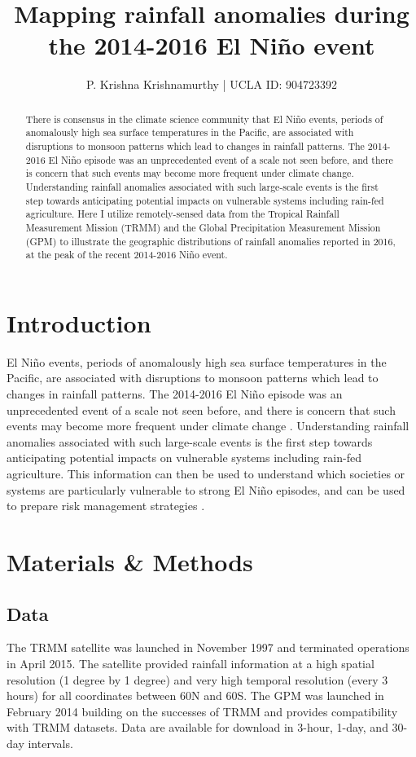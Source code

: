 \documentclass[12pt]{article}
\title{Mapping rainfall anomalies during the 2014-2016 El Ni{\~n}o event}
\author{P. Krishna Krishnamurthy | UCLA ID: 904723392}
\date{}
\begin{document}
\maketitle

\begin{abstract}
There is consensus in the climate science community that El Ni{\~n}o events, periods of anomalously high sea surface temperatures in the Pacific, are associated with disruptions to monsoon patterns which lead to changes in rainfall patterns. The 2014-2016 El Ni{\~n}o episode was an unprecedented event of a scale not seen before, and there is concern that such events may become more frequent under climate change. Understanding rainfall anomalies associated with such large-scale events is the first step towards anticipating potential impacts on vulnerable systems including rain-fed agriculture. Here I utilize remotely-sensed data from the Tropical Rainfall Measurement Mission (TRMM) and the Global Precipitation Measurement Mission (GPM) to illustrate the geographic distributions of rainfall anomalies reported in 2016, at the peak of the recent 2014-2016 Ni{\~n}o event.
\end{abstract}

\section{Introduction}
El Ni{\~n}o events, periods of anomalously high sea surface temperatures in the Pacific, are associated with disruptions to monsoon patterns which lead to changes in rainfall patterns. The 2014-2016 El Ni{\~n}o episode was an unprecedented event of a scale not seen before, and there is concern that such events may become more frequent under climate change \cite{cai2014increasing}. Understanding rainfall anomalies associated with such large-scale events is the first step towards anticipating potential impacts on vulnerable systems including rain-fed agriculture. This information can then be used to understand which societies or systems are particularly vulnerable to strong El Ni{\~n}o episodes, and can be used to prepare risk management strategies \cite{wang2017nino}. 

\section{Materials \& Methods}
\subsection{Data}
The TRMM satellite was launched in November 1997 and terminated operations in April 2015. The satellite provided rainfall information at a high spatial resolution (1 degree  by 1 degree) and very high temporal resolution (every 3 hours) for all coordinates between 60\textdegree N and 60\textdegree S. The GPM was launched in February 2014 building on the successes of TRMM and provides compatibility with TRMM datasets. Data are available for download in 3-hour, 1-day, and 30-day intervals.
\end{document}
